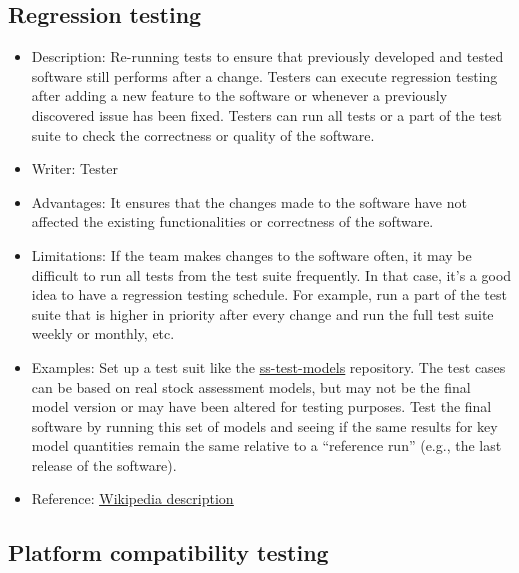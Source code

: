 \documentclass[
]{book}
\begin{document}
\hypertarget{regression-testing}{%
\subsection{Regression testing}\label{regression-testing}}

\begin{itemize}
\item
  Description: Re-running tests to ensure that previously developed and tested software still performs after a change. Testers can execute regression testing after adding a new feature to the software or whenever a previously discovered issue has been fixed. Testers can run all tests or a part of the test suite to check the correctness or quality of the software.
\item
  Writer: Tester
\item
  Advantages: It ensures that the changes made to the software have not affected the existing functionalities or correctness of the software.
\item
  Limitations: If the team makes changes to the software often, it may be difficult to run all tests from the test suite frequently. In that case, it's a good idea to have a regression testing schedule. For example, run a part of the test suite that is higher in priority after every change and run the full test suite weekly or monthly, etc.
\item
  Examples: Set up a test suit like the \href{https://github.com/nmfs-stock-synthesis/ss-test-models}{\underline{ss-test-models}} repository. The test cases can be based on real stock assessment models, but may not be the final model version or may have been altered for testing purposes. Test the final software by running this set of models and seeing if the same results for key model quantities remain the same relative to a ``reference run'' (e.g., the last release of the software).
\item
  Reference: \href{https://en.wikipedia.org/wiki/Regression_testing}{\underline{Wikipedia description}}
\end{itemize}

\hypertarget{platform-compatibility-testing}{%
\subsection{Platform compatibility testing}\label{platform-compatibility-testing}}
\end{document}
